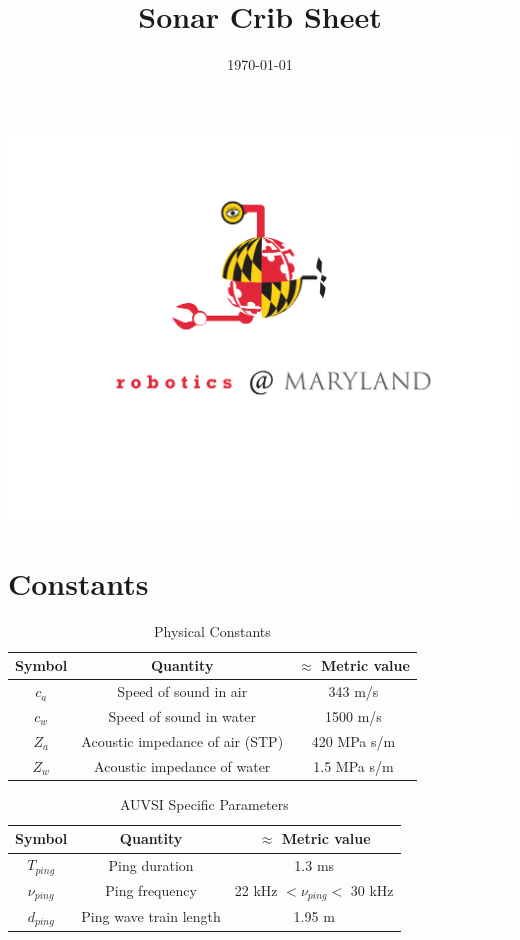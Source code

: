 \documentclass[10pt]{amsart}
\title{\huge{Sonar Crib Sheet}}
\date{\today}
\begin{document}
\begin{center}
\includegraphics[scale=0.4]{robocrab.pdf}
\end{center}
\maketitle


\section{Constants}


\begin{table}[h]
\caption{Physical Constants}
\begin{tabular}{|c|c c|}
\hline\hline
Symbol	&	Quantity							& \(\approx\) Metric value \\
\hline
\(c_a\)	& Speed of sound in air				& 343 m/s	 	\\
\(c_w\)	& Speed of sound in water			& 1500 m/s		\\
\(Z_a\)	& Acoustic impedance of air (STP)	& 420 MPa s/m	\\
\(Z_w\) & Acoustic impedance of water		  & 1.5 MPa s/m	\\
\hline
\end{tabular}
\label{tab:PhysicalConstants}
\end{table}


\begin{table}[h]
\caption{AUVSI Specific Parameters}
\begin{tabular}{|c|c c|}
\hline\hline
Symbol	&	Quantity							& \(\approx\) Metric value \\
\hline
\(T_{ping}\)	& Ping duration						& 1.3 ms		 	\\
\(\nu_{ping}\)	& Ping frequency					& 22 kHz \(< \nu_{ping} <\) 30 kHz \\
\(d_{ping}\)	& Ping wave train length			& 1.95 m \\
\hline
\end{tabular}
\label{tab:PhysicalConstants}
\end{table}
\end{document}
